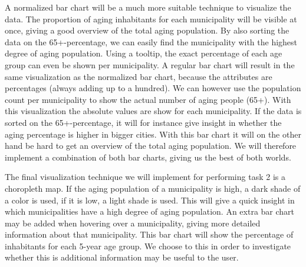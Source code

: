 A normalized bar chart will be a much more suitable technique to visualize the data. The proportion of aging inhabitants for each municipality will be visible at once, giving a good overview of the total aging population. By also sorting the data on the 65+-percentage, we can easily find the municipality with the highest degree of aging population. Using a tooltip, the exact percentage of each age group can even be shown per municipality. A regular bar chart will result in the same visualization as the normalized bar chart, because the attributes are percentages (always adding up to a hundred). We can however use the population count per municipality to show the actual number of aging people (65+). With this visualization the absolute values are show for each municipality. If the data is sorted on the 65+-percentage, it will for instance give insight in whether the aging percentage is higher in bigger cities. With this bar chart it will on the other hand be hard to get an overview of the total aging population. We will therefore implement a combination of both bar charts, giving us the best of both worlds.

The final visualization technique we will implement for performing task 2 is a choropleth map. If the aging population of a municipality is high, a dark shade of a color is used, if it is low, a light shade is used. This will give a quick insight in which municipalities have a high degree of aging population. An extra bar chart may be added when hovering over a municipality, giving more detailed information about that municipality. This bar chart will show the percentage of inhabitants for each 5-year age group. We choose to this in order to investigate whether this is additional information may be useful to the user.
